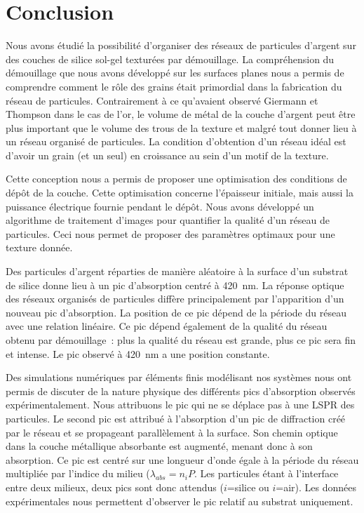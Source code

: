 \section{Conclusion}
Nous avons étudié la possibilité d'organiser des réseaux de particules d'argent sur des couches de silice sol-gel texturées par démouillage. La compréhension du démouillage que nous avons développé sur les surfaces planes nous a permis de comprendre comment le rôle des grains était primordial dans la fabrication du réseau de particules. Contrairement à ce qu'avaient observé Giermann et Thompson dans le cas de l'or, le volume de métal de la couche d'argent peut être plus important que le volume des trous de la texture et malgré tout donner lieu à un réseau organisé de particules. La condition d'obtention d'un réseau idéal est d'avoir un grain (et un seul) en croissance au sein d'un motif de la texture. \par 
Cette conception nous a permis de proposer une optimisation des conditions de dépôt de la couche. Cette optimisation concerne l'épaisseur initiale, mais aussi la puissance électrique fournie pendant le dépôt. Nous avons développé un algorithme de traitement d'images pour quantifier la qualité d'un réseau de particules. Ceci nous permet de proposer des paramètres optimaux pour une texture donnée.\par 
Des particules d'argent réparties de manière aléatoire à la surface d'un substrat de silice donne lieu à un pic d'absorption centré à 420~nm. La réponse optique des réseaux organisés de particules diffère principalement par l'apparition d'un nouveau pic d'absorption. La position de ce pic dépend de la période du réseau avec une relation linéaire. Ce pic dépend également de la qualité du réseau obtenu par démouillage~: plus la qualité du réseau est grande, plus ce pic sera fin et intense. Le pic observé à 420~nm a une position constante.\par 
Des simulations numériques par éléments finis modélisant nos systèmes nous ont permis de discuter de la nature physique des différents pics d'absorption observés expérimentalement. Nous attribuons le pic qui ne se déplace pas à une LSPR des particules. Le second pic est attribué à l'absorption d'un pic de diffraction créé par le réseau et se propageant parallèlement à la surface. Son chemin optique dans la couche métallique absorbante est augmenté, menant donc à son absorption. Ce pic est centré sur une longueur d'onde égale à la période du réseau multipliée par l'indice du milieu ($\lambda_{abs}=n_{i}P$. Les particules étant à l'interface entre deux milieux, deux pics sont donc attendus ($i$=silice ou $i$=air). Les données expérimentales nous permettent d'observer le pic relatif au substrat uniquement.\par \vspace{12pt}

